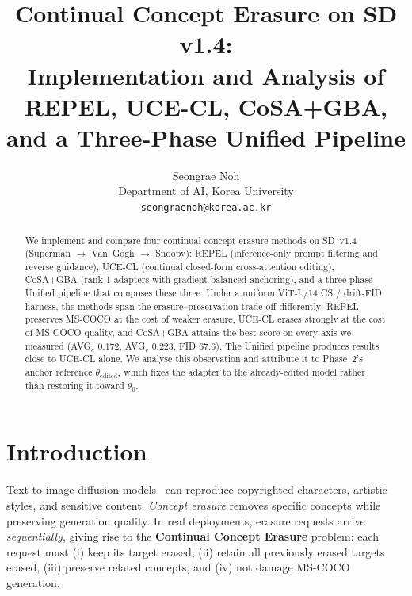 \documentclass[10pt,twocolumn,letterpaper]{article}
\begin{document}
\title{Continual Concept Erasure on SD v1.4:\\
Implementation and Analysis of REPEL, UCE-CL, CoSA+GBA,
and a Three-Phase Unified Pipeline}

\author{Seongrae Noh \\
Department of AI, Korea University \\
{\tt\small seongraenoh@korea.ac.kr}
}

\maketitle

\begin{abstract}
We implement and compare four continual concept erasure methods on
SD~v1.4 (Superman $\rightarrow$ Van~Gogh $\rightarrow$ Snoopy): REPEL
(inference-only prompt filtering and reverse guidance), UCE-CL
(continual closed-form cross-attention editing), CoSA+GBA (rank-1
adapters with gradient-balanced anchoring), and a three-phase Unified
pipeline that composes these three. Under a uniform ViT-L/14
CS / drift-FID harness, the methods span the erasure--preservation
trade-off differently: REPEL preserves MS-COCO at the cost of weaker
erasure, UCE-CL erases strongly at the cost of MS-COCO quality, and
CoSA+GBA attains the best score on every axis we measured
(AVG$_e$ $0.172$, AVG$_r$ $0.223$, FID $67.6$). The Unified pipeline
produces results close to UCE-CL alone. We analyse this observation
and attribute it to Phase~2's anchor reference $\theta_\text{edited}$,
which fixes the adapter to the already-edited model rather than
restoring it toward $\theta_0$.
\end{abstract}

\section{Introduction}
Text-to-image diffusion models~\cite{rombach2022high} can reproduce
copyrighted characters, artistic styles, and sensitive content.
\textit{Concept erasure} removes specific concepts while preserving
generation quality. In real deployments, erasure requests arrive
\textit{sequentially}, giving rise to the \textbf{Continual Concept
Erasure} problem: each request must (i) keep its target erased, (ii)
retain all previously erased targets erased, (iii) preserve related
concepts, and (iv) not damage MS-COCO generation.
\end{document}
